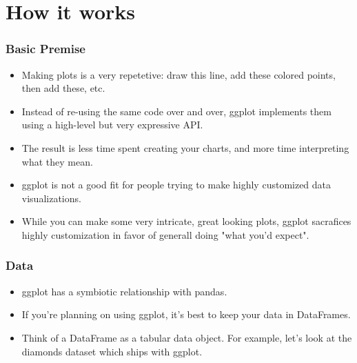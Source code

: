 \documentclass{beamer}
\begin{document}
\section{How it works}
\begin{frame}[fragile]
\frametitle{Basic Premise}
\begin{itemize}
\item Making plots is a very repetetive: draw this line, add these colored points, then add these, etc. 
\item Instead of re-using the same code over and over, ggplot implements them using a high-level but very expressive API.
\item The result is less time spent creating your charts, and more time interpreting what they mean.
\end{itemize}

\end{frame}
\begin{frame}[fragile]
	\begin{itemize}
\item ggplot is not a good fit for people trying to make highly customized data visualizations. 
\item While you can make some very intricate, great looking plots, ggplot sacrafices highly customization in favor of generall doing "what you'd expect".
	\end{itemize}

\end{frame}
\begin{frame}[fragile]
\frametitle{Data}
\begin{itemize}
\item ggplot has a symbiotic relationship with pandas. 
\item If you're planning on using ggplot, it's best to keep your data in DataFrames. 
\item Think of a DataFrame as a tabular data object. For example, let's look at the diamonds dataset which ships with ggplot.
\end{itemize}
\end{frame}
\end{document}
